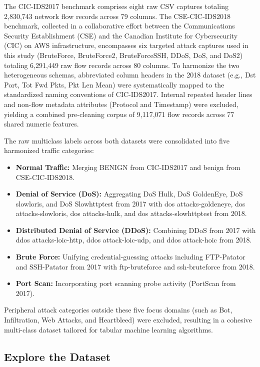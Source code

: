 \documentclass[12pt,a4paper]{report}
\begin{document}
The CIC-IDS2017 benchmark comprises eight raw CSV captures totaling 2,830,743 network flow records across 79 columns. The CSE-CIC-IDS2018 benchmark, collected in a collaborative effort between the Communications Security Establishment (CSE) and the Canadian Institute for Cybersecurity (CIC) on AWS infrastructure, encompasses six targeted attack captures used in this study (BruteForce, BruteForce2, BruteForceSSH, DDoS, DoS, and DoS2) totaling 6,291,449 raw flow records across 80 columns. To harmonize the two heterogeneous schemas, abbreviated column headers in the 2018 dataset (e.g., Dst Port, Tot Fwd Pkts, Pkt Len Mean) were systematically mapped to the standardized naming conventions of CIC-IDS2017. Internal repeated header lines and non-flow metadata attributes (Protocol and Timestamp) were excluded, yielding a combined pre-cleaning corpus of 9,117,071 flow records across 77 shared numeric features.

The raw multiclass labels across both datasets were consolidated into five harmonized traffic categories:
\begin{itemize}
    \item \textbf{Normal Traffic:} Merging BENIGN from CIC-IDS2017 and benign from CSE-CIC-IDS2018.
    \item \textbf{Denial of Service (DoS):} Aggregating DoS Hulk, DoS GoldenEye, DoS slowloris, and DoS Slowhttptest from 2017 with dos attacks-goldeneye, dos attacks-slowloris, dos attacks-hulk, and dos attacks-slowhttptest from 2018.
    \item \textbf{Distributed Denial of Service (DDoS):} Combining DDoS from 2017 with ddos attacks-loic-http, ddos attack-loic-udp, and ddos attack-hoic from 2018.
    \item \textbf{Brute Force:} Unifying credential-guessing attacks including FTP-Patator and SSH-Patator from 2017 with ftp-bruteforce and ssh-bruteforce from 2018.
    \item \textbf{Port Scan:} Incorporating port scanning probe activity (PortScan from 2017).
\end{itemize}
\newpage
Peripheral attack categories outside these five focus domains (such as Bot, Infiltration, Web Attacks, and Heartbleed) were excluded, resulting in a cohesive multi-class dataset tailored for tabular machine learning algorithms.

\subsection{Explore the Dataset}
\end{document}

